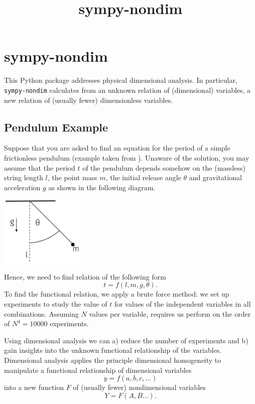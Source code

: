 \documentclass[11pt]{article}
\title{sympy-nondim}
\date{}
\begin{document}
\maketitle

\section{sympy-nondim}
This Python package addresses physical dimensional analysis. In particular, \texttt{sympy-nondim} calculates from an unknown relation of (dimensional) variables, a new relation of (usually fewer) dimensionless variables.

\subsection{Pendulum Example}
Suppose that you are asked to find an equation for the period of a simple frictionless pendulum (example taken from \cite{lemons2017student}). Unaware of the solution, you may assume that the period $t$ of the pendulum depends somehow on the (massless) string length $l$, the point mass $m$, the initial release angle $\theta$ and gravitational acceleration $g$ as shown in the following diagram.

\begin{center}
\includegraphics[width=0.3\textwidth]{pendulum.png}
\end{center}

Hence, we need to find relation of the following form $$t = f(l,m,g,\theta).$$ To find the functional relation, we apply a brute force method: we set up experiments to study the value of $t$ for values of the independent variables in all combinations. Assuming $N$ values per variable, requires us perform on the order of $N^4 = 10000$ experiments.

Using dimensional analysis we can a) reduce the number of experiments and b) gain insights into the unknown functional relationship of the variables. Dimensional analysis applies the principle dimensional homogeneity to manipulate a functional relationship of dimensional variables $$y = f(a,b,c,...)$$ into a new function $F$ of (usually fewer) nondimensional variables $$Y = F(A,B...).$$
\end{document}

